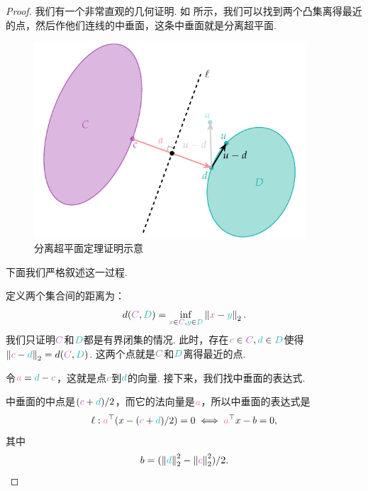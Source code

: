 \begin{proof}

    我们有一个非常直观的几何证明. 如 所示，我们可以找到两个凸集离得最近的点，然后作他们连线的中垂面，这条中垂面就是分离超平面. 
    
    \begin{figure}[H]
        \centering
        \includegraphics[width=0.9\textwidth]{figures/convex-anlaysis/separation-proof.pdf}
        \caption{分离超平面定理证明示意}
        \label{fig:separation-proof}
    \end{figure}
    
    下面我们严格叙述这一过程. 

    定义两个集合间的距离为：
    \[
    d(\light{C}, \contrastlight{D}) = \inf_{\light{x} \in \light{C}, \contrastlight{y} \in \contrastlight{D}} \norm{\light{x} - \contrastlight{y}}_2.
    \]
    我们只证明$\light{C}$和$\contrastlight{D}$都是有界闭集的情况. 此时，存在$\light{c} \in \light{C}, \contrastlight{d} \in \contrastlight{D}$使得$\norm{\light{c} - \contrastlight{d}}_2 = d(\light{C}, \contrastlight{D})$. 这两个点就是$\light{C}$和$\contrastlight{D}$离得最近的点.
    
    令$\textcolor{Salmon}{a} = \contrastlight{d} - \light{c}$，这就是点$\light{c}$到$\contrastlight{d}$的向量. 接下来，我们找中垂面的表达式. 
    
    中垂面的中点是$(\light{c} + \contrastlight{d})/2$，而它的法向量是$\textcolor{Salmon}{a}$，所以中垂面的表达式是
    \[
    \ell : \textcolor{Salmon}{a}^\top (x - (\light{c} + \contrastlight{d})/2) = 0 \iff \textcolor{Salmon}{a}^\top x - b = 0,
    \]
    其中
    \[
    b = (\norm{\contrastlight{d}}_2^2 - \norm{\light{c}}_2^2)/2.
    \]
    

\end{proof}
